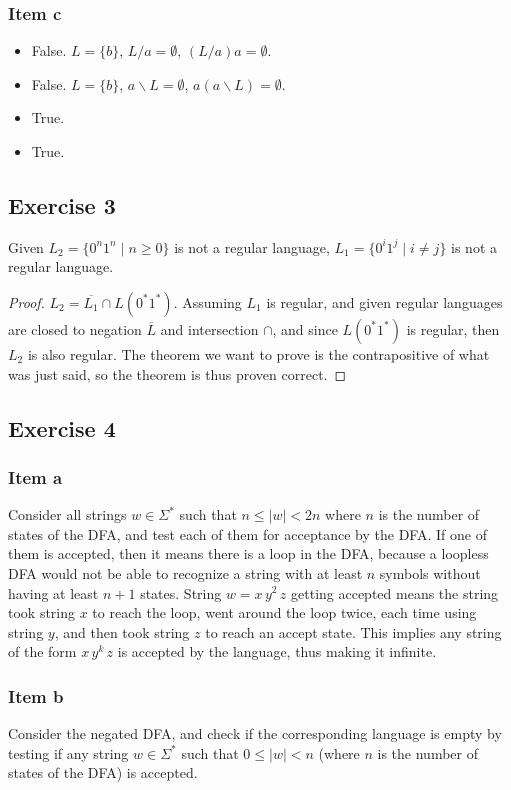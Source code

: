 \documentclass[docid=TP07]{tcom_TP}
\begin{document}
{\subsubsection{Item c}
\begin{itemize}
	\item False. $L=\{b\}$, $L/a=\emptyset$, $(L/a)a=\emptyset$.
	\item False. $L=\{b\}$, $a \backslash L = \emptyset$, $a(a \backslash L)=\emptyset$.
	\item True.
	\item True.
\end{itemize}
\subsection{Exercise 3}
\begin{theorem}
Given $L_2=\{0^n1^n\mid n \geq 0\}$ is not a regular language, $L_1=\{0^i1^j\mid i \neq j\}$ is not a regular language.
\end{theorem}
\begin{proof}
$L_2=\overline{L_1} \cap L(0^*1^*)$. Assuming $L_1$ is regular, and given regular languages are closed to negation $\overline{L}$ and intersection $\cap$, and since $L(0^*1^*)$ is regular, then $L_2$ is also regular. The theorem we want to prove is the contrapositive of what was just said, so the theorem is thus proven correct.
\end{proof}
\subsection{Exercise 4}
\subsubsection{Item a}
Consider all strings $w \in \Sigma^*$ such that $n \leq |w| < 2n$ where $n$ is the number of states of the DFA, and test each of them for acceptance by the DFA. If one of them is accepted, then it means there is a loop in the DFA, because a loopless DFA would not be able to recognize a string with at least $n$ symbols without having at least $n+1$ states. String $w=x\,y^2\,z$ getting accepted means the string took string $x$ to reach the loop, went around the loop twice, each time using string $y$, and then took string $z$ to reach an accept state. This implies any string of the form $x\,y^k\,z$ is accepted by the language, thus making it infinite.
\subsubsection{Item b}
Consider the negated DFA, and check if the corresponding language is empty by testing if any string $w \in \Sigma^*$ such that $0 \leq |w| < n$ (where $n$ is the number of states of the DFA) is accepted.
}
\end{document}
